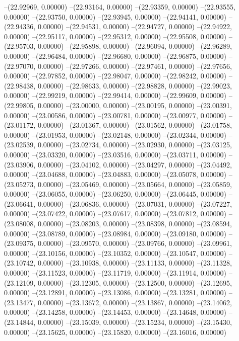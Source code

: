 --(22.92969, 0.00000)
--(22.93164, 0.00000)
--(22.93359, 0.00000)
--(22.93555, 0.00000)
--(22.93750, 0.00000)
--(22.93945, 0.00000)
--(22.94141, 0.00000)
--(22.94336, 0.00000)
--(22.94531, 0.00000)
--(22.94727, 0.00000)
--(22.94922, 0.00000)
--(22.95117, 0.00000)
--(22.95312, 0.00000)
--(22.95508, 0.00000)
--(22.95703, 0.00000)
--(22.95898, 0.00000)
--(22.96094, 0.00000)
--(22.96289, 0.00000)
--(22.96484, 0.00000)
--(22.96680, 0.00000)
--(22.96875, 0.00000)
--(22.97070, 0.00000)
--(22.97266, 0.00000)
--(22.97461, 0.00000)
--(22.97656, 0.00000)
--(22.97852, 0.00000)
--(22.98047, 0.00000)
--(22.98242, 0.00000)
--(22.98438, 0.00000)
--(22.98633, 0.00000)
--(22.98828, 0.00000)
--(22.99023, 0.00000)
--(22.99219, 0.00000)
--(22.99414, 0.00000)
--(22.99609, 0.00000)
--(22.99805, 0.00000)
--(23.00000, 0.00000)
--(23.00195, 0.00000)
--(23.00391, 0.00000)
--(23.00586, 0.00000)
--(23.00781, 0.00000)
--(23.00977, 0.00000)
--(23.01172, 0.00000)
--(23.01367, 0.00000)
--(23.01562, 0.00000)
--(23.01758, 0.00000)
--(23.01953, 0.00000)
--(23.02148, 0.00000)
--(23.02344, 0.00000)
--(23.02539, 0.00000)
--(23.02734, 0.00000)
--(23.02930, 0.00000)
--(23.03125, 0.00000)
--(23.03320, 0.00000)
--(23.03516, 0.00000)
--(23.03711, 0.00000)
--(23.03906, 0.00000)
--(23.04102, 0.00000)
--(23.04297, 0.00000)
--(23.04492, 0.00000)
--(23.04688, 0.00000)
--(23.04883, 0.00000)
--(23.05078, 0.00000)
--(23.05273, 0.00000)
--(23.05469, 0.00000)
--(23.05664, 0.00000)
--(23.05859, 0.00000)
--(23.06055, 0.00000)
--(23.06250, 0.00000)
--(23.06445, 0.00000)
--(23.06641, 0.00000)
--(23.06836, 0.00000)
--(23.07031, 0.00000)
--(23.07227, 0.00000)
--(23.07422, 0.00000)
--(23.07617, 0.00000)
--(23.07812, 0.00000)
--(23.08008, 0.00000)
--(23.08203, 0.00000)
--(23.08398, 0.00000)
--(23.08594, 0.00000)
--(23.08789, 0.00000)
--(23.08984, 0.00000)
--(23.09180, 0.00000)
--(23.09375, 0.00000)
--(23.09570, 0.00000)
--(23.09766, 0.00000)
--(23.09961, 0.00000)
--(23.10156, 0.00000)
--(23.10352, 0.00000)
--(23.10547, 0.00000)
--(23.10742, 0.00000)
--(23.10938, 0.00000)
--(23.11133, 0.00000)
--(23.11328, 0.00000)
--(23.11523, 0.00000)
--(23.11719, 0.00000)
--(23.11914, 0.00000)
--(23.12109, 0.00000)
--(23.12305, 0.00000)
--(23.12500, 0.00000)
--(23.12695, 0.00000)
--(23.12891, 0.00000)
--(23.13086, 0.00000)
--(23.13281, 0.00000)
--(23.13477, 0.00000)
--(23.13672, 0.00000)
--(23.13867, 0.00000)
--(23.14062, 0.00000)
--(23.14258, 0.00000)
--(23.14453, 0.00000)
--(23.14648, 0.00000)
--(23.14844, 0.00000)
--(23.15039, 0.00000)
--(23.15234, 0.00000)
--(23.15430, 0.00000)
--(23.15625, 0.00000)
--(23.15820, 0.00000)
--(23.16016, 0.00000)
